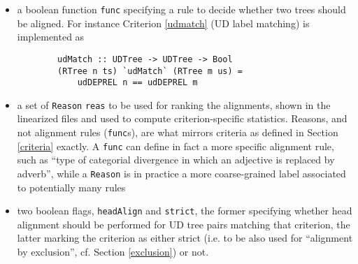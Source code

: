 \begin{itemize}
    \item a boolean function \texttt{func} specifying a rule to decide whether two trees should be aligned. For instance Criterion \ref{udmatch} (UD label matching) is implemented as
    \begin{lstlisting}
        udMatch :: UDTree -> UDTree -> Bool
        (RTree n ts) `udMatch` (RTree m us) = 
            udDEPREL n == udDEPREL m
    \end{lstlisting}
    \item a set of \texttt{Reason} \texttt{reas} to be used for ranking the alignments, shown in the linearized files and used to compute criterion-specific statistics. Reasons, and not alignment rules (\texttt{func}s), are what mirrors criteria as defined in Section \ref{criteria} exactly. A \texttt{func} can define in fact a more specific alignment rule, such as ``type of categorial divergence in which an adjective is replaced by adverb'', while a \texttt{Reason} is in practice a more coarse-grained label associated to potentially many rules
    \item two boolean flags, \texttt{headAlign} and \texttt{strict}, the former specifying whether head alignment should be performed for UD tree pairs matching that criterion, the latter marking the criterion as either strict (i.e. to be also used for ``alignment by exclusion'', cf. Section \ref{exclusion}) or not.
\end{itemize}